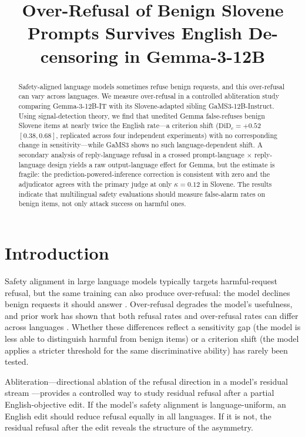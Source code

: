 \documentclass[11pt,letterpaper]{article}
\title{Over-Refusal of Benign Slovene Prompts Survives English De-censoring in Gemma-3-12B}
\author{}
\date{}
\begin{document}
\maketitle

\begin{abstract}
Safety-aligned language models sometimes refuse benign requests, and this over-refusal can vary across languages. We measure over-refusal in a controlled abliteration study comparing Gemma-3-12B-IT with its Slovene-adapted sibling GaMS3-12B-Instruct. Using signal-detection theory, we find that unedited Gemma false-refuses benign Slovene items at nearly twice the English rate---a criterion shift ($\text{DiD}_c = +0.52$ $[0.38, 0.68]$, replicated across four independent experiments) with no corresponding change in sensitivity---while GaMS3 shows no such language-dependent shift. A secondary analysis of reply-language refusal in a crossed prompt-language $\times$ reply-language design yields a raw output-language effect for Gemma, but the estimate is fragile: the prediction-powered-inference correction is consistent with zero and the adjudicator agrees with the primary judge at only $\kappa = 0.12$ in Slovene. The results indicate that multilingual safety evaluations should measure false-alarm rates on benign items, not only attack success on harmful ones.
\end{abstract}

\section{Introduction}

Safety alignment in large language models typically targets harmful-request refusal, but the same training can also produce over-refusal: the model declines benign requests it should answer \citep{Rottger2023, Souly2024}. Over-refusal degrades the model's usefulness, and prior work has shown that both refusal rates and over-refusal rates can differ across languages \citep{Shen2024, Yong2023, Wang2023, Deng2023}. Whether these differences reflect a sensitivity gap (the model is less able to distinguish harmful from benign items) or a criterion shift (the model applies a stricter threshold for the same discriminative ability) has rarely been tested.

Abliteration---directional ablation of the refusal direction in a model's residual stream \citep{Arditi2024}---provides a controlled way to study residual refusal after a partial English-objective edit. If the model's safety alignment is language-uniform, an English edit should reduce refusal equally in all languages. If it is not, the residual refusal after the edit reveals the structure of the asymmetry.
\end{document}
